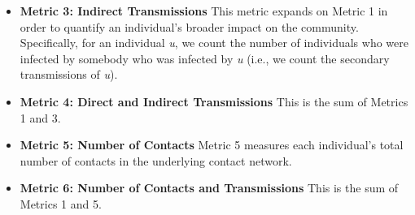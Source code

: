 \documentclass[twocolumn]{bmcart}%
\def\texttt{[image: ]}
\begin{document}
\begin{itemize}
\item \textbf{Metric 3: Indirect Transmissions} This metric expands on Metric 1 in order to quantify an individual's broader impact on the community. Specifically, for an individual \textit{u}, we count the number of individuals who were infected by somebody who was infected by \textit{u} (i.e., we count the secondary transmissions of \textit{u}).\newline

\item \textbf{Metric 4: Direct and Indirect Transmissions} This is the sum of Metrics 1 and 3.
\newline

\item \textbf{Metric 5: Number of Contacts} Metric 5 measures each individual's total number of contacts in the underlying contact network.
\newline

\item \textbf{Metric 6: Number of Contacts and Transmissions} This is the sum of Metrics 1 and 5.\newline

\end{itemize}

\end{document}
